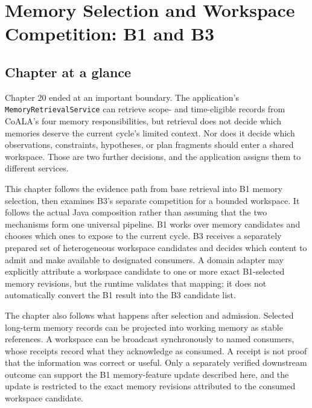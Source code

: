 \chapter{Memory Selection and Workspace Competition: B1 and B3}

\label{ch:memory-selection-workspace}

\section*{Chapter at a glance}
{}

Chapter 20 ended at an important boundary. The application's \texttt{Memory\allowbreak{}Retrieval\allowbreak{}Service} can retrieve scope- and time-eligible records from CoALA's four memory responsibilities, but retrieval does not decide which memories deserve the current cycle's limited context. Nor does it decide which observations, constraints, hypotheses, or plan fragments should enter a shared workspace. Those are two further decisions, and the application assigns them to different services.

This chapter follows the evidence path from base retrieval into B1 memory selection, then examines B3's separate competition for a bounded workspace. It follows the actual Java composition rather than assuming that the two mechanisms form one universal pipeline. B1 works over memory candidates and chooses which ones to expose to the current cycle. B3 receives a separately prepared set of heterogeneous workspace candidates and decides which content to admit and make available to designated consumers. A domain adapter may explicitly attribute a workspace candidate to one or more exact B1-selected memory revisions, but the runtime validates that mapping; it does not automatically convert the B1 result into the B3 candidate list.

The chapter also follows what happens after selection and admission. Selected long-term memory records can be projected into working memory as stable references. A workspace can be broadcast synchronously to named consumers, whose receipts record what they acknowledge as consumed. A receipt is not proof that the information was correct or useful. Only a separately verified downstream outcome can support the B1 memory-feature update described here, and the update is restricted to the exact memory revisions attributed to the consumed workspace candidate.

